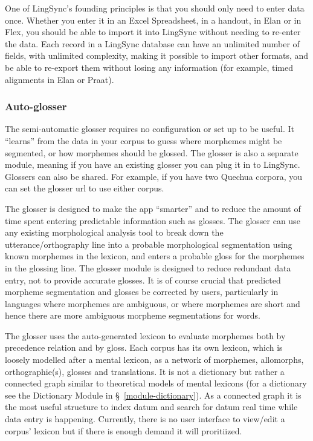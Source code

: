 \documentclass[letterpaper, 12pt, dvips]{mitwpl}
\begin{document}
One of LingSync's founding principles is that you should only need to enter data once. Whether you enter it in an Excel Spreadsheet, in a handout, in Elan or in Flex, you should be able to import it into LingSync without needing to re-enter the data.  Each record in a LingSync database can have an unlimited number of fields, with unlimited complexity, making it possible to import other formats, and be able to re-export them without losing any information (for example, timed alignments in Elan or Praat). 

\subsubsection{Auto-glosser}


The semi-automatic glosser requires no configuration or set up to be useful. It ``learns'' from the data in your corpus to guess where morphemes might be segmented, or how morphemes should be glossed. The glosser is also a separate module, meaning if you have an existing glosser you can plug it in to LingSync. Glossers can also be shared. For example, if you have two Quechua corpora, you can set the glosser url to use either corpus.  

The glosser is designed to make the app ``smarter'' and to reduce the amount of time spent entering predictable information such as glosses. The glosser can use any existing morphological analysis tool to break down the utterance/orthography line  into a probable morphological segmentation using known morphemes in the lexicon, and enters a probable gloss for the morphemes in the glossing line. The glosser module is designed to reduce redundant data entry, not to provide accurate glosses. It is of course crucial that predicted morpheme segmentation and glosses be corrected by users, particularly in languages where morphemes are ambiguous, or where morphemes are short and hence there are more ambiguous morpheme segmentations for words. 

The glosser uses the auto-generated lexicon to evaluate morphemes both by precedence relation and by gloss. Each corpus has its own lexicon, which is loosely modelled after a mental lexicon, as a network of morphemes, allomorphs, orthographie(s), glosses and translations.  It is not a dictionary but rather a connected graph similar to theoretical models of mental lexicons (for a dictionary see the Dictionary Module in \S~\ref{module-dictionary}). As a connected graph it is the most useful structure to index datum and search for datum real time while data entry is happening. Currently, there is no user interface to view/edit a corpus' lexicon but if there is enough demand it will proritiized.
\end{document}
